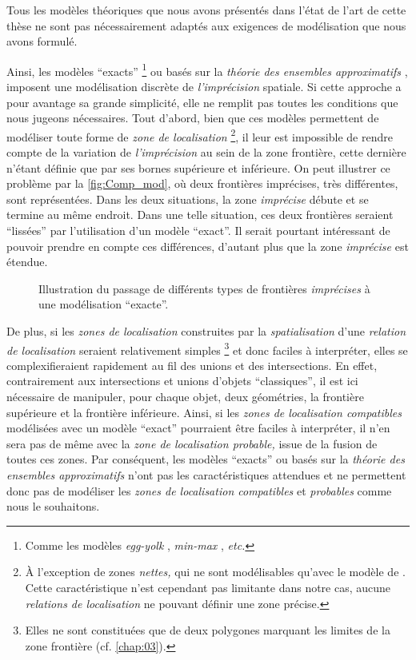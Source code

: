 Tous les modèles théoriques que nous avons présentés dans l'état de
l'art de cette thèse ne sont pas nécessairement adaptés aux exigences
de modélisation que nous avons formulé.

Ainsi, les modèles \enquote{exacts} \footnote{Comme les modèles
  \emph{egg-yolk} \autocite{Cohn1996}, \emph{min-max}
  \autocite{Clementini1996}, \emph{etc.}} ou basés sur la
\emph{théorie des ensembles approximatifs} \autocite{Pawlak1982},
imposent une modélisation discrète de \emph{l'imprécision}
spatiale. Si cette approche a pour avantage sa grande simplicité, elle
ne remplit pas toutes les conditions que nous jugeons
nécessaires. Tout d'abord, bien que ces modèles permettent de
modéliser toute forme de \emph{zone de localisation} \footnote{À
  l'exception de zones \emph{nettes,} qui ne sont modélisables qu'avec
  le modèle de \textcite{Bejaoui2009}. Cette caractéristique n'est
  cependant pas limitante dans notre cas, aucune \emph{relations de
    localisation} ne pouvant définir une zone précise.}, il leur est
impossible de rendre compte de la variation de \emph{l'imprécision} au
sein de la zone frontière, cette dernière n'étant définie que par ses
bornes supérieure et inférieure. On peut illustrer ce problème par la
\autoref{fig:Comp_mod}, où deux frontières imprécises, très
différentes, sont représentées. Dans les deux situations, la zone
\emph{imprécise} débute et se termine au même endroit. Dans une telle
situation, ces deux frontières seraient \enquote{lissées} par
l'utilisation d'un modèle \enquote{exact}. Il serait pourtant
intéressant de pouvoir prendre en compte ces différences, d'autant
plus que la zone \emph{imprécise} est étendue.

\begin{figure}[hb]
  \centering 
  \caption{Illustration du passage de différents types de frontières
    \emph{imprécises} à une modélisation \enquote{exacte}.}
  \label{fig:Comp_mod}
\end{figure}

De plus, si les \emph{zones de localisation} construites par la
\emph{spatialisation} d'une \emph{relation de localisation} seraient
relativement simples \footnote{Elles ne sont constituées que de deux
  polygones marquant les limites de la zone frontière
  (cf. \autoref{chap:03}).} et donc faciles à interpréter, elles se
complexifieraient rapidement au fil des unions et des
intersections. En effet, contrairement aux intersections et unions
d'objets \enquote{classiques}, il est ici nécessaire de manipuler,
pour chaque objet, deux géométries, la frontière supérieure et la
frontière inférieure. Ainsi, si les \emph{zones de localisation
  compatibles} modélisées avec un modèle \enquote{exact} pourraient
être faciles à interpréter, il n'en sera pas de même avec la
\emph{zone de localisation probable,} issue de la fusion de toutes ces
zones. Par conséquent, les modèles \enquote{exacts} ou basés sur la
\emph{théorie des ensembles approximatifs} n'ont pas les
caractéristiques attendues et ne permettent donc pas de modéliser les
\emph{zones de localisation compatibles} et \emph{probables} comme
nous le souhaitons.


